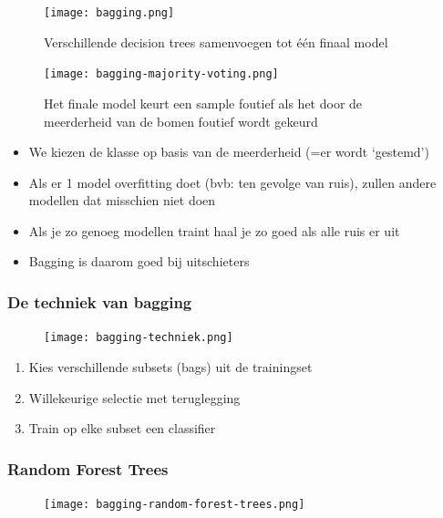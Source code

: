 \documentclass{article}
\begin{document}
\begin{figure}[H]
    \centering
    \texttt{[image: bagging.png]}
    \caption{Verschillende decision trees samenvoegen tot één finaal model}
\end{figure}

\begin{figure}[H]
    \centering
    \texttt{[image: bagging-majority-voting.png]}
    \caption{Het finale model keurt een sample foutief als het door de meerderheid van de bomen foutief wordt gekeurd}
\end{figure}

\begin{itemize}
    \item We kiezen de klasse op basis van de meerderheid (=er wordt `gestemd')
    \item Als er 1 model overfitting doet (bvb: ten gevolge van ruis), zullen andere modellen dat misschien niet doen
    \item Als je zo genoeg modellen traint haal je zo goed als alle ruis er uit
    \item Bagging is daarom goed bij uitschieters
\end{itemize}

\subsubsection{De techniek van bagging}

\begin{figure}[H]
    \centering
    \texttt{[image: bagging-techniek.png]}
\end{figure}

\begin{enumerate}
    \item Kies verschillende subsets (bags) uit de trainingset
    \item Willekeurige selectie met teruglegging
    \item Train op elke subset een classifier
\end{enumerate}

\subsubsection{Random Forest Trees}

\begin{figure}[H]
    \centering
    \texttt{[image: bagging-random-forest-trees.png]}
\end{figure}
\end{document}
